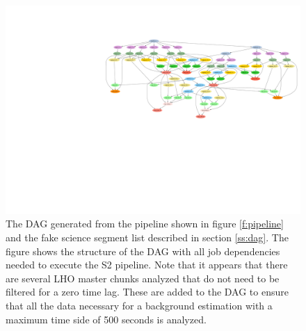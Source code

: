 \begin{figure}
\begin{center}
\hspace*{-0.2in}\includegraphics[width=\linewidth]{figures/pipeline/fake_segs_dag}
\end{center}
\caption{\label{f:fake_segs_dag}%
The DAG generated from the pipeline shown in figure \ref{f:pipeline} and the
fake science segment list described in section \ref{ss:dag}. The figure shows
the structure of the DAG with all job dependencies needed to execute the S2
pipeline. Note that it appears that there are several LHO master chunks
analyzed that do not need to be filtered for a zero time lag.  These are added
to the DAG to ensure that all the data necessary for a background estimation
with a maximum time side of 500 seconds is analyzed.
}
\end{figure}

